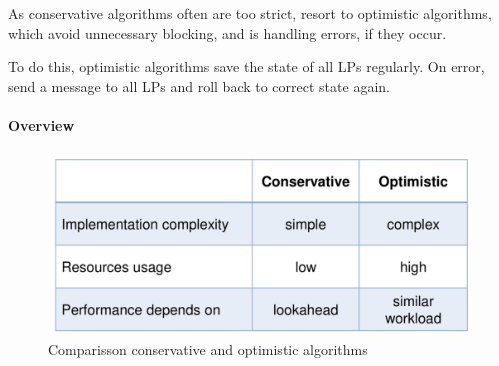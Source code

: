 \documentclass[english]{panikzettel}
\begin{document}
	As conservative algorithms often are too strict, resort to optimistic algorithms, which avoid unnecessary blocking, and is handling errors, if they occur.

	To do this, optimistic algorithms save the state of all LPs regularly.
	On error, send a message to all LPs and roll back to correct state again.

	\paragraph{Overview}
	\label{pgf:synchronization-and-coordination-algorithms:overview}
	
	\begin{figure}[H]
		\centering
		\includegraphics[width=\textwidth]{img/5-cons-vs-opti.png}
		\caption{Comparisson conservative and optimistic algorithms}
		\label{img-5-cons-vs-opti}
	\end{figure}
	
	
	
	
	
	
		

	





	
	
 	
	
		
	

		
		
		
			
			
			
	
	
	
	
	
				
\end{document}
